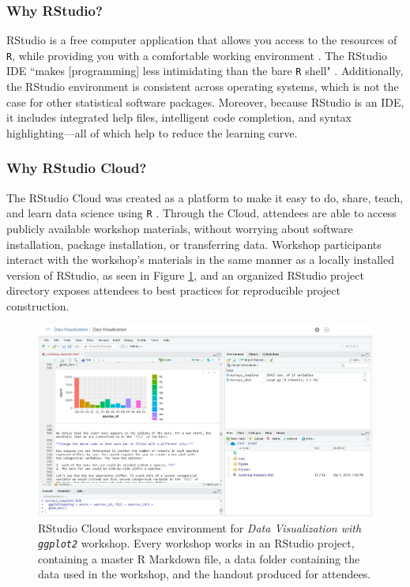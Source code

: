\documentclass[12pt]{article}
\begin{document}
\subsubsection{Why RStudio?}

\quad RStudio is a free computer application that allows you access to the 
resources of \texttt{R}, while providing you with a comfortable working
environment \citep{rstudio}. The RStudio IDE ``makes [programming] less
intimidating than the bare \texttt{R} shell" \citep[p.\ 59]{mine}. Additionally,
the RStudio environment is consistent across operating systems, which is not the
case for other statistical software packages. Moreover, because RStudio is an
IDE, it includes integrated help files, intelligent code completion, and syntax 
highlighting---all of which help to reduce the learning curve. 

\subsubsection{Why RStudio Cloud?} 

\quad The RStudio Cloud was created as a platform to make it easy to do, share,
teach, and learn data science using \texttt{R} \citep{RStudioCloud}. Through the 
Cloud, attendees are able to access publicly available workshop materials, 
without worrying about software installation, package installation, or
transferring data. Workshop participants interact with the workshop's materials
in the same manner as a locally installed version of RStudio, as seen in Figure
\ref{fig:cloud}, and an organized RStudio project directory exposes attendees to 
best practices for reproducible project construction. 

\begin{figure}[t!]
    \centering
    \includegraphics[width = \textwidth]{images/RStudio_Cloud_blind.png}
    \caption{RStudio Cloud workspace environment for \emph{Data Visualization
    with \texttt{ggplot2}} workshop. Every workshop works in an RStudio project,
    containing a master R Markdown file, a data folder containing the
    data used in the workshop, and the handout produced for attendees.} 
    \label{fig:cloud}
\end{figure}
\end{document}
